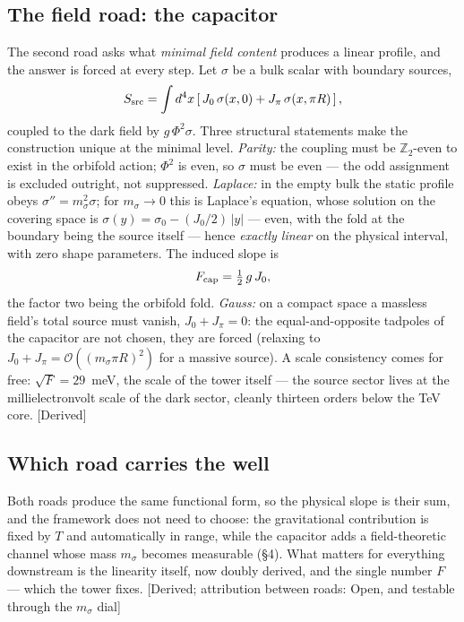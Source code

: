 \subsection{The field road: the capacitor}
The second road asks what \emph{minimal field content} produces a linear profile, and the answer is forced at every step. Let $\sigma$ be a bulk scalar with boundary sources,
\begin{equation}
S_{\rm src}=\int d^{4}x\left[\,J_{0}\,\sigma(x,0)+J_{\pi}\,\sigma(x,\pi R)\,\right],
\end{equation}
coupled to the dark field by $g\,\Phi^{2}\sigma$. Three structural statements make the construction unique at the minimal level. \emph{Parity:} the coupling must be $\mathbb{Z}_{2}$-even to exist in the orbifold action; $\Phi^{2}$ is even, so $\sigma$ must be even --- the odd assignment is excluded outright, not suppressed. \emph{Laplace:} in the empty bulk the static profile obeys $\sigma''=m_{\sigma}^{2}\sigma$; for $m_{\sigma}\to0$ this is Laplace's equation, whose solution on the covering space is $\sigma(y)=\sigma_{0}-(J_{0}/2)\,|y|$ --- even, with the fold at the boundary being the source itself --- hence \emph{exactly linear} on the physical interval, with zero shape parameters. The induced slope is
\begin{equation}
F_{\rm cap}=\tfrac{1}{2}\,g\,J_{0},
\end{equation}
the factor two being the orbifold fold. \emph{Gauss:} on a compact space a massless field's total source must vanish, $J_{0}+J_{\pi}=0$: the equal-and-opposite tadpoles of the capacitor are not chosen, they are forced (relaxing to $J_{0}+J_{\pi}=\mathcal{O}((m_{\sigma}\pi R)^{2})$ for a massive source). A scale consistency comes for free: $\sqrt{F}=29$~meV, the scale of the tower itself --- the source sector lives at the millielectronvolt scale of the dark sector, cleanly thirteen orders below the TeV core. [Derived]

\subsection{Which road carries the well}
Both roads produce the same functional form, so the physical slope is their sum, and the framework does not need to choose: the gravitational contribution is fixed by $T$ and automatically in range, while the capacitor adds a field-theoretic channel whose mass $m_{\sigma}$ becomes measurable (\S4). What matters for everything downstream is the linearity itself, now doubly derived, and the single number $F$ --- which the tower fixes. [Derived; attribution between roads: Open, and testable through the $m_{\sigma}$ dial]

